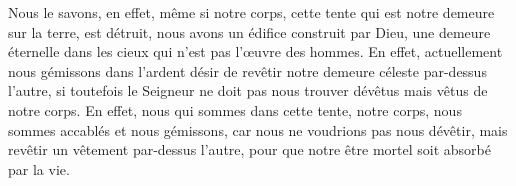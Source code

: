 Nous le savons, en effet,
	même si notre corps, cette tente qui est notre demeure sur la terre, est détruit,
	nous avons un édifice construit par Dieu,
	une demeure éternelle dans les cieux qui n’est pas l’œuvre des hommes.
En effet, actuellement nous gémissons
		dans l’ardent désir de revêtir notre demeure céleste par-dessus l’autre,
	si toutefois le Seigneur ne doit pas nous trouver dévêtus
		mais vêtus de notre corps.
En effet, nous qui sommes dans cette tente, notre corps,
	nous sommes accablés et nous gémissons, car nous ne voudrions pas nous dévêtir,
	mais revêtir un vêtement par-dessus l’autre,
	pour que notre être mortel soit absorbé par la vie.
